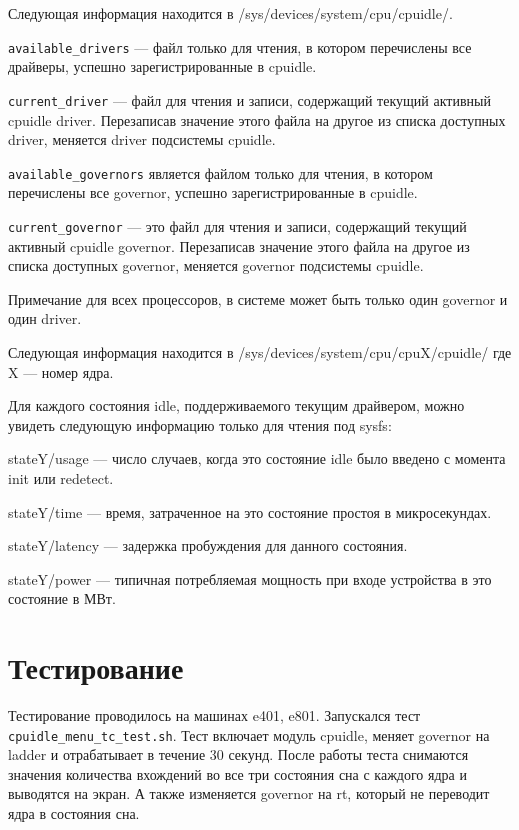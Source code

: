 \documentclass{article}
\begin{document}
Следующая информация находится в /sys/devices/system/cpu/cpuidle/.

\texttt{available\_drivers} — файл только для чтения, в котором перечислены все драйверы, успешно зарегистрированные в cpuidle.

\texttt{current\_driver} — файл для чтения и записи, содержащий текущий активный cpuidle driver. Перезаписав значение этого файла на другое из списка доступных driver, меняется driver подсистемы cpuidle.

\texttt{available\_governors} является файлом только для чтения, в котором перечислены все governor, успешно зарегистрированные в cpuidle.

\texttt{current\_governor} — это файл для чтения и записи, содержащий текущий активный cpuidle governor. Перезаписав значение этого файла на другое из списка доступных governor, меняется governor подсистемы cpuidle.

Примечание для всех процессоров, в системе может быть только один governor и один driver.

Следующая информация находится в /sys/devices/system/cpu/cpuX/cpuidle/ где X --- номер ядра.

Для каждого состояния idle, поддерживаемого текущим драйвером, можно увидеть следующую информацию только для чтения под sysfs:

stateY/usage --- число случаев, когда это состояние idle было введено с момента init или redetect.

stateY/time --- время, затраченное на это состояние простоя в микросекундах. 

stateY/latency --- задержка пробуждения для данного состояния.

stateY/power --- типичная потребляемая мощность при входе устройства в это состояние в МВт.


\newpage
\section{Тестирование}
Тестирование проводилось на машинах e401, e801. Запускался тест \texttt{cpuidle\_menu\_tc\_test.sh}. Тест включает модуль cpuidle, меняет governor на ladder и отрабатывает в течение 30 секунд. После работы теста снимаются значения количества вхождений во все три состояния сна с каждого ядра и выводятся на экран. А также изменяется governor на rt, который не переводит ядра в состояния сна.
\end{document}
